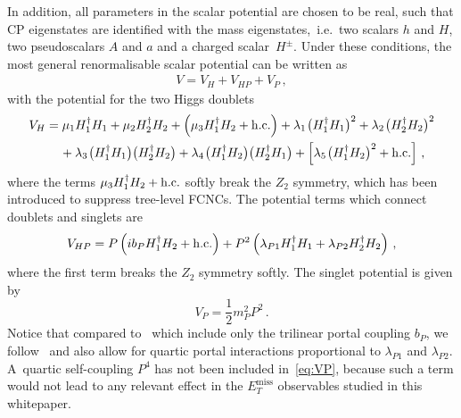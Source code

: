 \documentclass[a4paper, 11pt,notoc]{article}
\newcommand{\MET}{\ensuremath{E_T^\mathrm{miss}}\xspace}
\begin{document}
In addition, all parameters in the scalar potential are chosen to be real, such that CP eigenstates are identified with the mass eigenstates,~i.e.~two scalars $h$ and $H$, two pseudoscalars $A$ and $a$ and a charged scalar~$H^\pm$. Under these conditions, the most general renormalisable scalar potential can be written as 
\begin{align} \label{eq:V2HDMa}
V=V_H+V_{HP}+V_P\,,
\end{align}
with the potential for the two Higgs doublets
\begin{equation}\label{eq:VH}
\begin{split}
V_{H} & = \mu_1 H_1^\dagger H_1 + \mu_2 H_2^\dagger H_2 + \left ( \mu_3  H_1^\dagger H_2 + {\rm h.c.} \right ) + \lambda_1  \hspace{0.25mm} \big ( H_1^\dagger H_1  \big )^2  + \lambda_2  \hspace{0.25mm} \big ( H_2^\dagger H_2 \big  )^2  \\
& \phantom{xx} +  \lambda_3 \hspace{0.25mm} \big ( H_1^\dagger H_1  \big ) \big ( H_2^\dagger H_2  \big ) + \lambda_4  \hspace{0.25mm} \big ( H_1^\dagger H_2  \big ) \big ( H_2^\dagger H_1  \big ) + \left [ \lambda_5   \hspace{0.25mm} \big ( H_1^\dagger H_2 \big )^2 + {\rm h.c.} \right ]  \,,
\end{split}
\end{equation}
where the terms $\mu_3  H_1^\dagger H_2 + {\rm h.c.}$  softly break the  $Z_2$ symmetry, which has been introduced to suppress tree-level FCNCs. The potential terms which connect doublets and singlets are 
\begin{equation} \label{eq:VHP}
\begin{split}
V_{HP}  = P \left ( i  b_P   H_1^\dagger H_2 + {\rm h.c.} \right ) + P^2 \left (  \lambda_{P1}  H_1^\dagger H_1 +   \lambda_{P2}    H_2^\dagger H_2 \right )  \,,
\end{split} 
\end{equation}
where the first term breaks the  $Z_2$ symmetry softly.  The singlet potential is given by 
\begin{equation} \label{eq:VP}
V_{P}  =  \frac{1}{2}  m_P^2  P^2  \,.
\end{equation}
Notice  that compared to~\cite{Ipek:2014gua,No:2015xqa,Goncalves:2016iyg,Tunney:2017yfp} which include only the trilinear portal coupling $b_P$, we  follow~\cite{Bauer:2017ota} and also allow for quartic portal interactions proportional to $\lambda_{P1}$ and  $\lambda_{P2}$. A~quartic self-coupling $P^4$ has not been included in~\eqref{eq:VP}, because such a term would not lead to any relevant effect in the $\MET$ observables studied in this whitepaper.
\end{document}
